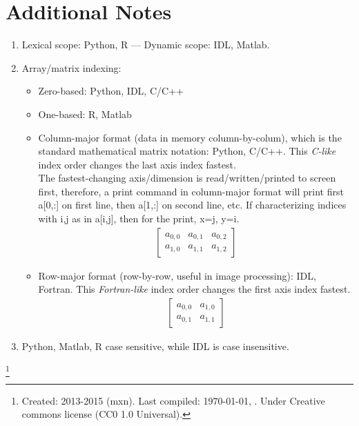 \documentclass[10pt]{article}
\providecommand{\bvec}[1]{\begin{bmatrix}#1\end{bmatrix}}
\begin{document}
\section*{Additional Notes}
\begin{enumerate}
\item Lexical scope: Python, R --- Dynamic scope: IDL, Matlab.
\item Array/matrix indexing:
  \begin{itemize}
  \item Zero-based: Python, IDL, C/C++
  \item One-based: R, Matlab
  \item Column-major format (data in memory column-by-colum), which is
    the standard mathematical matrix notation: Python, C/C++.  This
    \emph{C-like} index order changes the last axis index fastest.\\
    The fastest-changing axis/dimension is read/written/printed to
    screen first, therefore, a print command in column-major format
    will print first a[0,:] on first line, then a[1,:] on second line,
    etc. If characterizing indices with i,j as in a[i,j], then for the
    print, x=j, y=i.
    \begin{align}
      \bvec{a_{0,0}&a_{0,1}&a_{0,2}\\
        a_{1,0}& a_{1,1}&a_{1,2}}
    \end{align}
  \item Row-major format (row-by-row, useful in image processing):
    IDL, Fortran. This \emph{Fortran-like} index order changes the
    first axis index fastest.
    \begin{align}
      \bvec{a_{0,0}&a_{1,0}\\
        a_{0,1}& a_{1,1}}
    \end{align}
  \end{itemize}
\item Python, Matlab, R case sensitive, while IDL is case insensitive.
\end{enumerate}






\let\thefootnote\relax\footnote{Created: 2013-2015 (mxn). Last
  compiled: \small \today, \currenttime. Under Creative commons
  license (CC0 1.0 Universal).}



\end{document}
